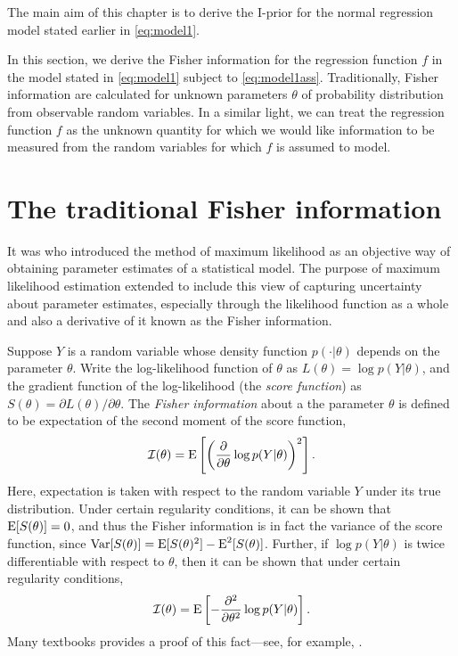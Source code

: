 \documentclass[a4paper,showframe,11pt,draft]{report}
\begin{document}

The main aim of this chapter is to derive the I-prior for the normal regression model stated earlier in \eqref{eq:model1}.

In this section, we derive the Fisher information for the regression function $f$ in the model stated in \eqref{eq:model1} subject to \eqref{eq:model1ass}.
Traditionally, Fisher information are calculated for unknown parameters $\theta$ of probability distribution from observable random variables.
In a similar light, we can treat the regression function $f$ as the unknown quantity for which we would like information to be measured from the random variables for which $f$ is assumed to model.

\section{The traditional Fisher information}

It was \citet{ra1922mathematical} who introduced the method of maximum likelihood as an objective way of obtaining parameter estimates of a statistical model.
The purpose of maximum likelihood estimation extended to include this view of capturing uncertainty about parameter estimates, especially through the likelihood function as a whole and also a derivative of it known as the Fisher information.

Suppose $Y$ is a random variable whose density function $p(\cdot|\theta)$ depends on the parameter $\theta$.
Write the log-likelihood function of $\theta$ as $L(\theta) = \log p(Y|\theta)$, and the gradient function of the log-likelihood  (the \emph{score function}) as $S(\theta) = \partial L(\theta)/\partial\theta$.
The \emph{Fisher information} about a the parameter $\theta$ is defined to be expectation of the second moment of the score function, 
\[
  {\mathcal I}(\theta) = \operatorname{E}\left[\left(\frac{\partial}{\partial\theta} \log p(Y|\theta)\right)^2\right].
\]
Here, expectation is taken with respect to the random variable $Y$ under its true distribution.
Under certain regularity conditions, it can be shown that $\operatorname{E}[S(\theta)] = 0$, and thus the Fisher information is in fact the variance of the score function, since $\operatorname{Var}[S(\theta)] = \operatorname{E}[S(\theta)^2] - \operatorname{E}^2[S(\theta)]$.
Further, if $\log p(Y|\theta)$ is twice differentiable with respect to $\theta$, then it can be shown that under certain regularity conditions,
\[
  {\mathcal I}(\theta) = \operatorname{E}\left[-\frac{\partial ^ 2}{\partial\theta^2} \log p(Y|\theta)\right].
\]
Many textbooks provides a proof of this fact---see, for example, \citet{wasserman2013all}.
\end{document}

